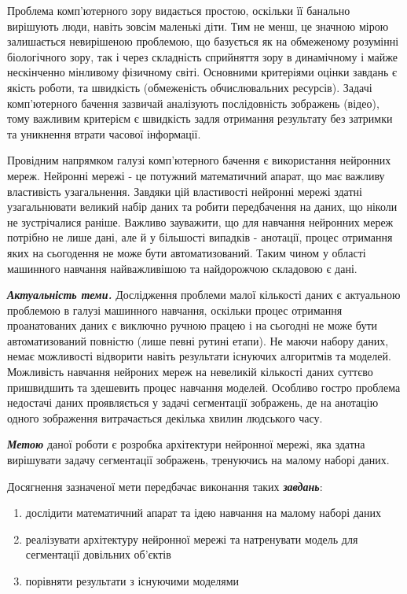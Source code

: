 \documentclass[a4paper,12pt,titlepage]{article}
\begin{document}
Проблема комп’ютерного зору видається простою, оскільки її банально вирішують люди, навіть зовсім маленькі діти. Тим не менш, це значною мірою залишається невирішеною проблемою, що базується як на обмеженому розумінні біологічного зору, так і через складність сприйняття зору в динамічному і майже нескінченно мінливому фізичному світі. Основними критеріями оцінки завдань є якість роботи, та швидкість (обмеженість обчислювальних ресурсів). Задачі комп’ютерного бачення зазвичай аналізують послідовність зображень (відео), тому важливим критерієм є швидкість задля отримання результату без затримки та уникнення втрати часової інформації.

Провідним напрямком галузі комп'ютерного бачення є використання нейронних мереж. Нейронні мережі - це потужний математичний апарат, що має важливу властивість узагальнення. Завдяки цій властивості нейронні мережі здатні узагальнювати великий набір даних та робити передбачення на даних, що ніколи не зустрічалися раніше. Важливо зауважити, що для навчання нейронних мереж потрібно не лише дані, але й у більшості випадків - анотації, процес отримання яких на сьогодення не може бути автоматизований. Таким чином у області машинного навчання найважливішою та найдорожчою складовою є дані.
 

\textbf{\textit{Актуальність теми.}} Дослідження проблеми малої кількості даних є актуальною проблемою в галузі машинного навчання, оскільки процес отримання проанатованих даних є виключно ручною працею і на сьогодні не може бути автоматизований повністю (лише певні рутині етапи). Не маючи набору даних, немає можливості відворити навіть результати існуючих алгоритмів та моделей. Можливість навчання нейроних мереж на невеликій кількості даних суттєво пришвидшить та здешевить процес навчання моделей. Особливо гостро проблема недостачі даних проявляється у задачі сегментації зображень, де на анотацію одного зображення витрачається декілька хвилин людського часу.

\textbf{\textit{Метою}} даної роботи є розробка архітектури нейронної мережі, яка здатна вирішувати задачу сегментації зображень, тренуючись на малому наборі даних. 

Досягнення зазначеної мети передбачає виконання таких \textbf{\textit{завдань}}:
        \begin{enumerate}[1)]

\item
дослідити математичний апарат та ідею навчання на малому наборі даних
\item
реалізувати архітектуру нейронної мережі та натренувати модель для сегментації довільних об'єктів
\item
порівняти результати з існуючими моделями

\end{enumerate} 
\end{document}

